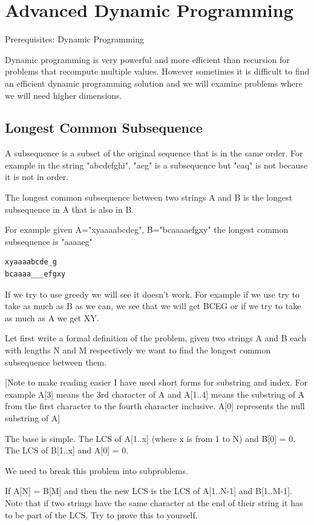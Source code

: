 \documentclass[11pt,oneside]{book}
\begin{document}
        \section{ Advanced Dynamic Programming }
        

Prerequisites: Dynamic Programming

Dynamic programming is very powerful and more efficient than recursion for problems that recompute multiple values. However sometimes it is difficult to find an efficient dynamic programming solution and we will examine problems where we will need higher dimensions.

\subsection{Longest Common Subsequence}

A subsequence is a subset of the original sequence that is in the same order. For example in the string "abcdefghi", "aeg" is a subsequence but "eaq" is not because it is not in order.

The longest common subsequence between two strings A and B is the longest subsequence in A that is also in B.

For example given A="xyaaaabcdeg", B="bcaaaaefgxy" the longest common subsequence is "aaaaeg"

\begin{lstlisting}
xyaaaabcde_g
bcaaaa___efgxy
\end{lstlisting}

If we try to use greedy we will see it doesn't work. For example if we use try to take as much as B as we can, we see that we will get BCEG or if we try to take as much as A we get XY.

Let first write a formal definition of the problem, given two strings A and B each with lengths N and M respectively we want to find the longest common subsequence between them.

[Note to make reading easier I have used short forms for substring and index. For example A[3] means the 3rd character of A and A[1..4] means the substring of A from the first character to the fourth character inclusive. A[0] represents the null substring of A]

The base is simple. The LCS of A[1..x] (where x is from 1 to N) and B[0] = 0. The LCS of B[1..x] and A[0] = 0.

We need to break this problem into subproblems.

If A[N] = B[M] and then the new LCS is the LCS of A[1..N-1] and B[1..M-1]. Note that if two strings have the same character at the end of their string it has to be part of the LCS. Try to prove this to yourself.
\end{document}
